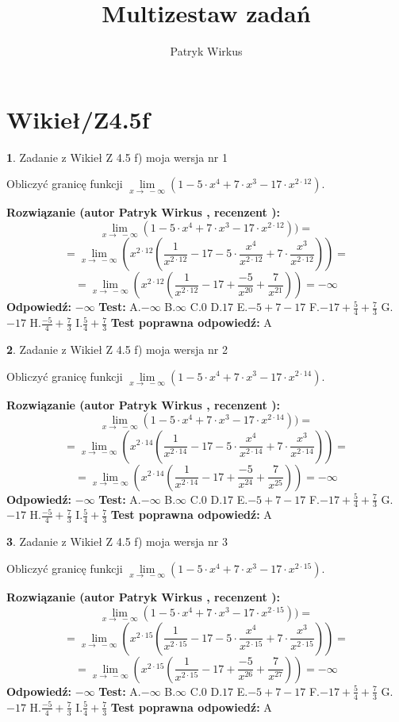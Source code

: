 \documentclass[12pt, a4paper]{article}
\title{Multizestaw zadań}
\author{Patryk Wirkus}
\date{}
\theoremstyle{definition} %
\newtheorem{zad}{}
\newcommand{\kategoria}[1]{\section{#1}}
\newcommand{\zadStart}[1]{\begin{zad}#1\newline}
\newcommand{\zadStop}{\end{zad}}
\newcommand{\rozwStart}[2]{\noindent \textbf{Rozwiązanie (autor #1 , recenzent #2): }\newline}
\newcommand{\rozwStop}{\newline}
\newcommand{\odpStart}{\noindent \textbf{Odpowiedź:}\newline}
\newcommand{\odpStop}{\newline}
\newcommand{\testStart}{\noindent \textbf{Test:}\newline}
\newcommand{\testStop}{\newline}
\newcommand{\kluczStart}{\noindent \textbf{Test poprawna odpowiedź:}\newline}
\newcommand{\kluczStop}{\newline}
\begin{document}
\maketitle

\kategoria{Wikieł/Z4.5f}


\zadStart{Zadanie z Wikieł Z 4.5 f) moja wersja nr 1}



Obliczyć granicę funkcji  $\lim\limits_{x\to\ -\infty}(1 - 5 \cdot x^{4}+7 \cdot x^{3}- 17 \cdot x^{2\cdot12})$.
\zadStop
\rozwStart{Patryk Wirkus}{}
$$\lim\limits_{x\to\ -\infty}(1 - 5 \cdot x^{4}+7 \cdot x^{3}- 17 \cdot x^{2\cdot12}))=$$
$$=\lim\limits_{x\to\ -\infty}(x^{2\cdot12}(\frac{1}{x^{2\cdot12}}-17 -5 \cdot \frac{x^{4}}{x^{2\cdot12}}+7 \cdot \frac{x^{3}}{x^{2\cdot12}}))=$$
$$=\lim\limits_{x\to\ -\infty}(x^{2\cdot12}(\frac{1}{x^{2\cdot12}}-17 + \frac{-5}{x^{20}}+ \frac{7}{x^{21}}))=-\infty$$
\rozwStop
\odpStart
$-\infty$
\odpStop
\testStart
A.$-\infty$ B.$\infty$ C.$0$ D.$17$ E.$-5 + 7 - 17$
F.$-17+\frac{5}{4}+\frac{7}{3}$ G.$-17$
H.$\frac{-5}{4}+\frac{7}{3}$
I.$\frac{5}{4}+\frac{7}{3}$
\testStop
\kluczStart
A
\kluczStop



\zadStart{Zadanie z Wikieł Z 4.5 f) moja wersja nr 2}



Obliczyć granicę funkcji  $\lim\limits_{x\to\ -\infty}(1 - 5 \cdot x^{4}+7 \cdot x^{3}- 17 \cdot x^{2\cdot14})$.
\zadStop
\rozwStart{Patryk Wirkus}{}
$$\lim\limits_{x\to\ -\infty}(1 - 5 \cdot x^{4}+7 \cdot x^{3}- 17 \cdot x^{2\cdot14}))=$$
$$=\lim\limits_{x\to\ -\infty}(x^{2\cdot14}(\frac{1}{x^{2\cdot14}}-17 -5 \cdot \frac{x^{4}}{x^{2\cdot14}}+7 \cdot \frac{x^{3}}{x^{2\cdot14}}))=$$
$$=\lim\limits_{x\to\ -\infty}(x^{2\cdot14}(\frac{1}{x^{2\cdot14}}-17 + \frac{-5}{x^{24}}+ \frac{7}{x^{25}}))=-\infty$$
\rozwStop
\odpStart
$-\infty$
\odpStop
\testStart
A.$-\infty$ B.$\infty$ C.$0$ D.$17$ E.$-5 + 7 - 17$
F.$-17+\frac{5}{4}+\frac{7}{3}$ G.$-17$
H.$\frac{-5}{4}+\frac{7}{3}$
I.$\frac{5}{4}+\frac{7}{3}$
\testStop
\kluczStart
A
\kluczStop



\zadStart{Zadanie z Wikieł Z 4.5 f) moja wersja nr 3}



Obliczyć granicę funkcji  $\lim\limits_{x\to\ -\infty}(1 - 5 \cdot x^{4}+7 \cdot x^{3}- 17 \cdot x^{2\cdot15})$.
\zadStop
\rozwStart{Patryk Wirkus}{}
$$\lim\limits_{x\to\ -\infty}(1 - 5 \cdot x^{4}+7 \cdot x^{3}- 17 \cdot x^{2\cdot15}))=$$
$$=\lim\limits_{x\to\ -\infty}(x^{2\cdot15}(\frac{1}{x^{2\cdot15}}-17 -5 \cdot \frac{x^{4}}{x^{2\cdot15}}+7 \cdot \frac{x^{3}}{x^{2\cdot15}}))=$$
$$=\lim\limits_{x\to\ -\infty}(x^{2\cdot15}(\frac{1}{x^{2\cdot15}}-17 + \frac{-5}{x^{26}}+ \frac{7}{x^{27}}))=-\infty$$
\rozwStop
\odpStart
$-\infty$
\odpStop
\testStart
A.$-\infty$ B.$\infty$ C.$0$ D.$17$ E.$-5 + 7 - 17$
F.$-17+\frac{5}{4}+\frac{7}{3}$ G.$-17$
H.$\frac{-5}{4}+\frac{7}{3}$
I.$\frac{5}{4}+\frac{7}{3}$
\testStop
\kluczStart
A
\kluczStop
\end{document}
